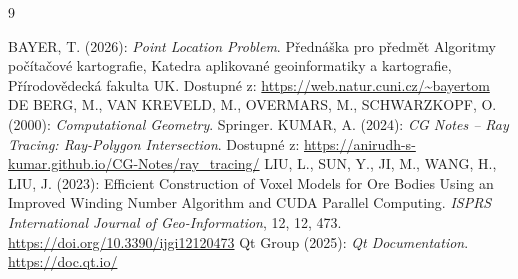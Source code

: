 \documentclass[11pt, a4paper]{article}
\begin{document}
\newpage
\renewcommand{\refname}{Zdroje} 
\begin{thebibliography}{9}

 BAYER, T. (2026): \textit{Point Location Problem}. Přednáška pro předmět Algoritmy počítačové kartografie, Katedra aplikované geoinformatiky a kartografie, Přírodovědecká fakulta UK. Dostupné z: \url{https://web.natur.cuni.cz/~bayertom}
 DE BERG, M., VAN KREVELD, M., OVERMARS, M., SCHWARZKOPF, O. (2000): \textit{Computational Geometry}. Springer.
KUMAR, A. (2024): \textit{CG Notes -- Ray Tracing: Ray-Polygon Intersection}. Dostupné z: \url{https://anirudh-s-kumar.github.io/CG-Notes/ray_tracing/}
 LIU, L., SUN, Y., JI, M., WANG, H., LIU, J. (2023): Efficient Construction of Voxel Models for Ore Bodies Using an Improved Winding Number Algorithm and CUDA Parallel Computing. \textit{ISPRS International Journal of Geo-Information}, 12, 12, 473. \url{https://doi.org/10.3390/ijgi12120473}
 Qt Group (2025): \textit{Qt Documentation}. \url{https://doc.qt.io/}

\end{thebibliography}
\end{document}
